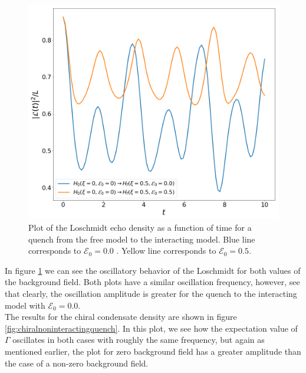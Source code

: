 \begin{figure}[h]
	\centering
	\includegraphics[scale=0.25]{figures/LoschmidtNonInteractingQuenchMassless}
	\caption{Plot of the Loschmidt echo density as a function of time for a quench from the free model to the interacting model. Blue line corresponds to $\mathcal{E}_0=0.0$ . Yellow line corresponds to $\mathcal{E}_0=0.5$.}
	\label{fig:loschmidtnoninteractingquenchmassless}
\end{figure}

In figure \ref{fig:loschmidtnoninteractingquenchmassless} we can see the oscillatory behavior of the Loschmidt for both values of the background field. Both plots have a similar oscillation frequency, however, see that clearly, the oscillation amplitude is greater for the quench to the interacting model with $\mathcal{E}_0=0.0$. \\


The results for the chiral condensate density are shown in figure \ref{fig:chiralnoninteractingquench}. In this plot, we see how the expectation value of $\Gamma$ oscillates in both cases with roughly the same frequency, but again as mentioned earlier, the plot for zero background field has a greater amplitude than the case of a non-zero background field. 

